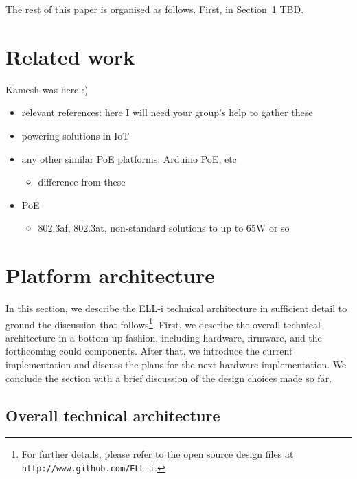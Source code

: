 \documentclass[draft,a4paper]{siamltex}
\begin{document}
The rest of this paper is organised as follows.  First, in
Section~\ref{sec:related} TBD.
 

\section{Related work}
\label{sec:related}

Kamesh was here :)

\begin{itemize}
  \item relevant references: here I will need your group's help to gather these
  \item powering solutions in IoT
  \item any other similar PoE platforms: Arduino PoE, etc
    \begin{itemize}
    \item difference from these
    \end{itemize}
  \item PoE
    \begin{itemize}
    \item 802.3af, 802.3at, non-standard solutions to up to 65W or so
    \end{itemize}
\end{itemize}
 

\section{Platform architecture}
\label{sec:architecture}

In this section, we describe the ELL-i technical architecture in
sufficient detail to ground the discussion that follows\footnote{For further
details, please refer to the open source design files at
\hbox{\tt http://www.github.com/ELL-i}.}.
First, we describe the overall technical architecture in a
bottom-up-fashion, including hardware, firmware, and the forthcoming
could components.  After that, we introduce the current
implementation and discuss the plans for the next hardware implementation.  We
conclude the section with a brief discussion of the design choices
made so far.

\subsection{Overall technical architecture}
\end{document}
